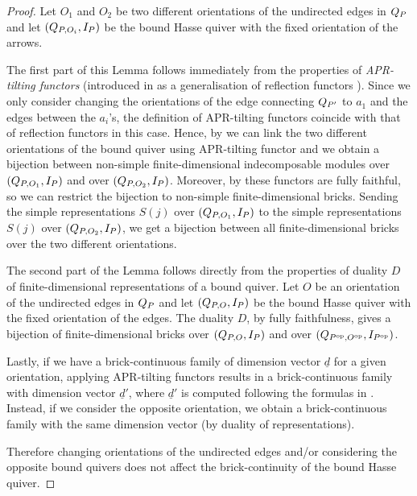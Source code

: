 \begin{proof}
	Let $O_1$ and $O_2$ be two different orientations of the undirected edges in $Q_{P}$ and let $(Q_{P, O_i}, I_P)$ be the bound Hasse quiver with the fixed orientation of the arrows.
	
	The first part of this Lemma follows immediately from the properties of \emph{APR-tilting functors} (introduced in \cite{auslander1979coxeter} as a generalisation of reflection functors \cite{bernstein1973coxeter}).
	Since we only consider changing the orientations of the edge connecting $Q_{P'}$ to $a_1$ and the edges between the $a_i$'s, the definition of APR-tilting functors coincide with that of reflection functors in this case.
	Hence, by \cite[Theorem 1.2]{bernstein1973coxeter} we can link the two different orientations of the bound quiver using APR-tilting functor and we obtain a bijection between non-simple finite-dimensional indecomposable modules over $(Q_{P, O_1}, I_P)$ and over $(Q_{P, O_2},I_P)$.	
	Moreover, by \cite[Theorem 1.11, 1.12]{auslander1979coxeter} these functors are fully faithful, so we can restrict the bijection to non-simple finite-dimensional bricks. Sending the simple representations $S(j)$ over $(Q_{P, O_1}, I_P)$ to the simple representations $S(j)$ over $(Q_{P, O_2}, I_P)$, we get a bijection between all finite-dimensional bricks over the two different orientations.
	
	The second part of the Lemma follows directly from the properties of duality $D$ of finite-dimensional representations of a bound quiver. Let $O$ be an orientation of the undirected edges in $Q_{P}$ and let $(Q_{P, O}, I_P)$ be the bound Hasse quiver with the fixed orientation of the edges. The duality $D$, by fully faithfulness, gives a bijection of finite-dimensional bricks over $(Q_{P, O}, I_P)$ and over $(Q_{P^{\mathrm{op}}, O^{\mathrm{op}}}, I_{P^{\mathrm{op}}})$.

	Lastly, if we have a brick-continuous family of dimension vector $\underline{d}$ for a given orientation, applying APR-tilting functors results in a brick-continuous family with dimension vector $\underline{d}'$, where $\underline{d}'$ is computed following the formulas in \cite[Theorem 1.1]{bernstein1973coxeter}. Instead, if we consider the opposite orientation, we obtain a brick-continuous family with the same dimension vector (by duality of representations).
	
	Therefore changing orientations of the undirected edges and/or considering the opposite bound quivers does not affect the brick-continuity of the bound Hasse quiver.
\end{proof}


